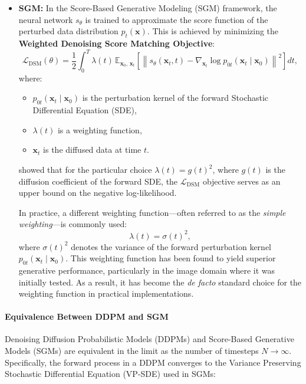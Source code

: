 \begin{itemize}
    \item \textbf{SGM:} In the Score-Based Generative Modeling (SGM) framework, the neural network \( s_{\theta} \) is trained to approximate the score function of the perturbed data distribution \( p_t(\mathbf{x}) \). This is achieved by minimizing the \textbf{Weighted Denoising Score Matching Objective}:
        \[
        \mathcal{L}_{\text{DSM}}(\theta) = \frac{1}{2} \int_0^T \lambda(t) \, \mathbb{E}_{\mathbf{x}_0,\, \mathbf{x}_t} \left[ \left\| s_\theta(\mathbf{x}_t, t) - \nabla_{\mathbf{x}_t} \log p_{0t}(\mathbf{x}_t \mid \mathbf{x}_0) \right\|^2 \right] dt,
        \]
        where:
        \begin{itemize}
            \item \( p_{0t}(\mathbf{x}_t \mid \mathbf{x}_0) \) is the perturbation kernel of the forward Stochastic Differential Equation (SDE),
            \item \( \lambda(t) \) is a weighting function,
            \item \( \mathbf{x}_t \) is the diffused data at time \( t \).
        \end{itemize}

        \cite{song2021maximum} showed that for the particular choice \( \lambda(t) = g(t)^2 \), where \( g(t) \) is the diffusion coefficient of the forward SDE, the \( \mathcal{L}_{\text{DSM}} \) objective serves as an upper bound on the negative log-likelihood.

        In practice, a different weighting function—often referred to as the \emph{simple weighting}—is commonly used:
        \[
        \lambda(t) = \sigma(t)^2,
        \]
        where \( \sigma(t)^2 \) denotes the variance of the forward perturbation kernel \( p_{0t}(\mathbf{x}_t \mid \mathbf{x}_0) \). This weighting function has been found to yield superior generative performance, particularly in the image domain where it was initially tested. As a result, it has become the \emph{de facto} standard choice for the weighting function in practical implementations.

\end{itemize}

\paragraph{Equivalence Between DDPM and SGM}

Denoising Diffusion Probabilistic Models (DDPMs) and Score-Based Generative Models (SGMs) are equivalent in the limit as the number of timesteps \( N \to \infty \). Specifically, the forward process in a DDPM converges to the Variance Preserving Stochastic Differential Equation (VP-SDE) used in SGMs:

